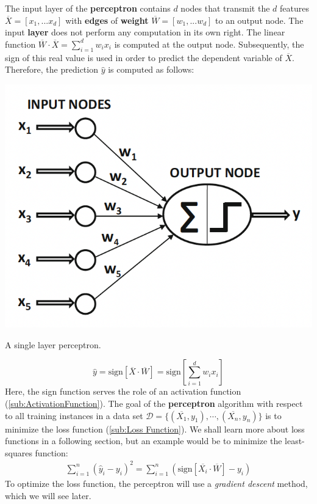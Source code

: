 \documentclass{tufte-handout}
\begin{document}
The input layer of the \textbf{perceptron} contains $d$ nodes that transmit the $d$ features $\overline{X} = [x_1, . . . x_d]$ with \textbf{edges} of \textbf{weight} $\overline{W} = [w_1, . . . w_d]$  to an output node. The input \textbf{layer} does not perform any computation in its own right. The linear function $\overline{W} \cdot \overline{X} =\sum^{d}_{i=1}  w_ix_i$ is computed at the output node. Subsequently, the sign of this real value is used in order to predict the dependent variable of $\overline{X}$. Therefore, the prediction $\hat y$ is computed as follows:
\begin{marginfigure}
  \includegraphics{SingleLayerP}
  \label{SingleLayerP}
  \caption{A single layer perceptron.}
\end{marginfigure}
  \label{sub:Single Layer Perceptron}
 $$\hat y = \text{sign}[\overline{X} \cdot \overline{W}] =\text{sign}\left[\sum^{d}_{i=1}  w_ix_i\right] $$ 
 Here, the sign function serves the role of an activation function (\ref{sub:ActivationFunction}). The goal of the \textbf{perceptron} algorithm with respect to all training instances in a data set $\mathcal{D} = \{(\overline{X_1}, y_1 ), \cdots,(\overline{X_n}, y_n )\}$ is to minimize the loss function (\ref{sub:Loss Function}). We shall learn more about loss functions in a following section, but an example would be to minimize the least-squares function: 
 \begin{equation*}
  \begin{split}
    \sum^{n}_{i=1} (\hat y_i - y_i)^2 =\sum^{n}_{i=1} \left(\text{sign}[\overline{X_i} \cdot \overline{W}] -y_i \right)
  \end{split}
 \end{equation*}
 To optimize the loss function, the perceptron will use a \textit{gradient descent} method, which we will see later.
\end{document}
